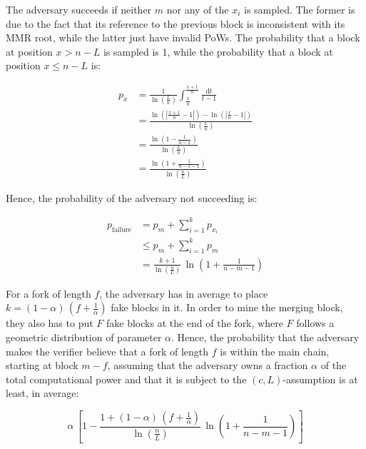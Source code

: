 \documentclass[11pt]{report}
\begin{document}
                The adversary succeeds if neither \(m\) nor any of the \(x_i\) is sampled. The former is due to the fact that its reference to the previous block is inconsistent with its MMR root, while the latter just have invalid PoWs. The probability that a block at position \(x>n - L\) is sampled is 1, while the probability that a block at position \(x\leqslant n-L\) is:
                
                \begin{align*}
                    p_x &= \frac{1}{\ln\left(\frac{L}{n}\right)}\int_{\frac{x}{n}}^{\frac{x+1}{n}}\frac{\mathrm{d}t}{t-1}\\
                    &= \frac{\ln\left(\left|\frac{x+1}{n}-1\right|\right)-\ln\left(\left|\frac{x}{n}-1\right|\right)}{\ln\left(\frac{L}{n}\right)}\\
                    &= \frac{\ln\left(1-\frac{1}{n-x}\right)}{\ln\left(\frac{L}{n}\right)}\\
                    &= \frac{\ln\left(1+\frac{1}{n-x-1}\right)}{\ln\left(\frac{n}{L}\right)}
                \end{align*}
                
                Hence, the probability of the adversary not succeeding is:
                
                \begin{align*}
                    p_{\text{failure}} &= p_m + \sum_{i=1}^kp_{x_i}\\
                    &\leqslant p_m + \sum_{i=1}^kp_m\\
                    &= \frac{k+1}{\ln\left(\frac{n}{L}\right)}\,\ln\left(1+\frac{1}{n-m-1}\right)
                \end{align*}
                
                For a fork of length \(f\), the adversary has in average to place \(k=(1-\alpha)\,\left(f+\frac{1}{\alpha}\right)\) fake blocks in it. In order to mine the merging block, they also has to put \(F\) fake blocks at the end of the fork, where \(F\) follows a geometric distribution of parameter \(\alpha\). Hence, the probability that the adversary makes the verifier believe that a fork of length \(f\) is within the main chain, starting at block \(m-f\), assuming that the adversary owns a fraction \(\alpha\) of the total computational power and that it is subject to the \((c,L)\)-assumption is at least, in average:
                
                \[\alpha\,\left[1-\frac{1+(1-\alpha)\,\left(f+\frac1\alpha\right)}{\ln\left(\frac{n}{L}\right)}\,\ln\left(1+\frac{1}{n-m-1}\right)\right]\]
                
\end{document}
